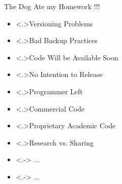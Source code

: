 \documentclass[11pt,xcolor=dvipsnames]{beamer}
\begin{document}
\begin{frame}[label=sec-1-0-4]{The Dog Ate my Homework !!! }
  \vspace{-.4cm}
  \begin{multicols}{2}
    \begin{itemize}[<+->]
    \item \alert<.>{Versioning Problems}
    \item \alert<.>{Bad Backup Practices}
    \item \alert<.>{Code Will be Available Soon}
    \item \alert<.>{No Intention to Release}
    \item \alert<.>{Programmer Left}
    \item \alert<.>{Commercial Code}
    \item \alert<.>{Proprietary Academic Code}
    \item \alert<.>{Research vs. Sharing}
    \item<.-> ...
    \item<.-> ...
    \end{itemize}
  \end{multicols}


\end{frame}
\end{document}
